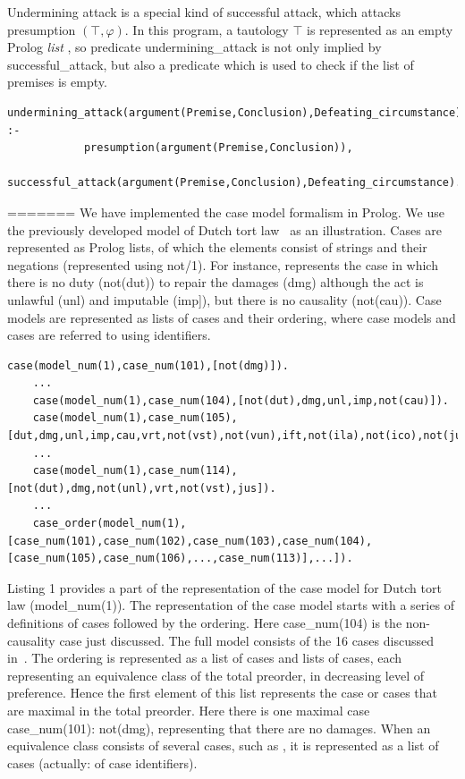 \documentclass{IOS-Book-Article}
\begin{document}
Undermining attack is a special kind of successful attack, which attacks presumption $(\top, \varphi)$. In this program, a tautology $\top$ is represented as an empty Prolog \textit{list} {\mf [ ]}, so predicate {\mf undermining\_attack} is not only implied by {\mf successful\_attack}, but also a predicate which is used to check if the list of premises is empty.
\begin{lstlisting}
undermining_attack(argument(Premise,Conclusion),Defeating_circumstance) :-
			presumption(argument(Premise,Conclusion)),
			successful_attack(argument(Premise,Conclusion),Defeating_circumstance).
\end{lstlisting}
=======
\noindent We have implemented the case model formalism in Prolog. We use the previously developed model of Dutch tort law~\cite{Verheij2017Formalizing} as an illustration. Cases are represented as Prolog lists, of which the elements consist of strings and their negations (represented using {\mf not/1}). For instance, {} represents the case in which there is no duty ({\mf not(dut)}) to repair the damages ({\mf dmg}) although the act is unlawful ({\mf unl}) and imputable ({\mf imp]}), but there is no causality ({\mf not(cau)}). Case models are represented as lists of cases and their ordering, where case models and cases are referred to using identifiers. 
	\begin{lstlisting}[caption={Definition of the Dutch tort law case model in Prolog},captionpos=b,float]
	case(model_num(1),case_num(101),[not(dmg)]).
	...
	case(model_num(1),case_num(104),[not(dut),dmg,unl,imp,not(cau)]).
	case(model_num(1),case_num(105),[dut,dmg,unl,imp,cau,vrt,not(vst),not(vun),ift,not(ila),not(ico),not(jus),prp]).
	...
	case(model_num(1),case_num(114),[not(dut),dmg,not(unl),vrt,not(vst),jus]).
	...
	case_order(model_num(1),[case_num(101),case_num(102),case_num(103),case_num(104),[case_num(105),case_num(106),...,case_num(113)],...]).
	\end{lstlisting}

Listing 1 provides a part of the representation of the case model for Dutch tort law ({\mf model\_num(1)}). 
The representation of the case model starts with a series of definitions of cases followed by the ordering. Here {\mf case\_num(104)} is the non-causality case just discussed. The full model consists of the 16 cases discussed in~\cite{Verheij2017Formalizing}. The ordering is represented as a list of cases and lists of cases, each representing an equivalence class of the total preorder, in decreasing level of preference. Hence the first element of this list represents the case or cases that are maximal in the total preorder. Here there is one maximal case {\mf case\_num(101): not(dmg)}, representing that there are no damages. When an equivalence class consists of several cases, such as {}, it is represented as a list of cases (actually: of case identifiers).
\end{document}
